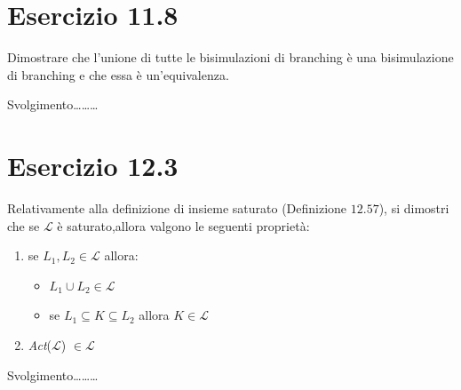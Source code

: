 		\newpage
		
	\section{Esercizio 11.8}
		\qquad Dimostrare che l'unione di tutte le bisimulazioni di branching \`e una
		bisimulazione di branching e che essa \`e un'equivalenza.
		
		\sectionline
		
		\qquad Svolgimento\ldots\ldots\ldots
		
		\newpage
		
	\section{Esercizio 12.3}
		\qquad Relativamente alla definizione di insieme saturato (Definizione
		$12.57$), si dimostri che se $\mathcal{L}$ \`e saturato,allora valgono le
		seguenti proprietà:
		\begin{enumerate}
		  \item se $L_1,L_2 \in \mathcal{L}$ allora:
		  \begin{itemize}
		    \item $L_1 \cup L_2 \in \mathcal{L}$
		    \item se $L_1 \subseteq K \subseteq L_2$ allora $K \in \mathcal{L}$
		  \end{itemize}
		  \item \emph{Act}($\mathcal{L}$) $\in \mathcal{L}$
		\end{enumerate}
		
		\sectionline
		
		\qquad Svolgimento\ldots\ldots\ldots